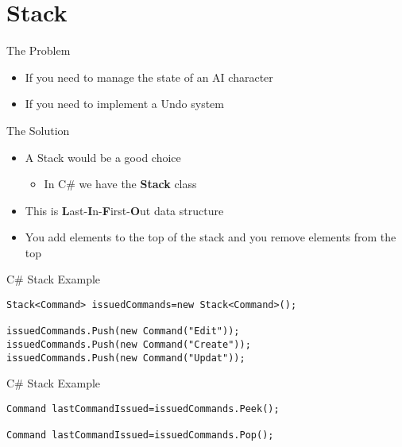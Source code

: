 \part{Stack}
\frame{\partpage}

\begin{frame}{The Problem}
	\begin{itemize}
		\pause \item If you need to manage the state of an AI character
		\pause \item If you need to implement a Undo system   
	\end{itemize}
\end{frame}

\begin{frame}{The Solution}
	\begin{itemize}
	\pause \item A Stack would be a good choice
	\begin{itemize}
		\pause \item In C\# we have the \textbf{Stack} class
	\end{itemize}
	\pause \item This is \textbf{L}ast-\textbf{I}n-\textbf{F}irst-\textbf{O}ut data structure
	\pause \item You add elements to the top of the stack and you remove elements from the top
\end{itemize}
\end{frame}

\begin{frame}[fragile]{C\# Stack
Example}
\begin{lstlisting}
Stack<Command> issuedCommands=new Stack<Command>();

issuedCommands.Push(new Command("Edit"));
issuedCommands.Push(new Command("Create"));
issuedCommands.Push(new Command("Updat"));

\end{lstlisting}
\end{frame}

\begin{frame}[fragile]{C\# Stack
	Example}
\begin{lstlisting}
Command lastCommandIssued=issuedCommands.Peek();

Command lastCommandIssued=issuedCommands.Pop();
\end{lstlisting}
\end{frame}
